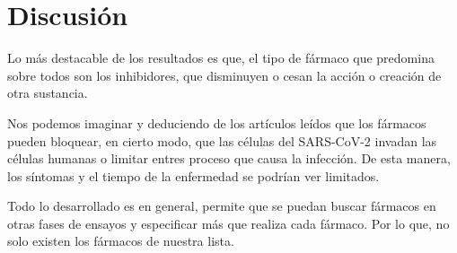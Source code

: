 \section{Discusión}
Lo más destacable de los resultados es que, el tipo de fármaco que predomina sobre todos son los inhibidores, que disminuyen o cesan la acción o creación de otra sustancia. 

Nos podemos imaginar y deduciendo de los artículos leídos \cite{Gordon2020} \cite{Gysi2020} \cite{Sayed2020} que los fármacos pueden bloquear, en cierto modo, que las células del SARS-CoV-2 invadan las células humanas o limitar entres proceso que causa la infección. De esta manera, los síntomas y el tiempo de la enfermedad se podrían ver limitados. 

Todo lo desarrollado es en general, permite que se puedan buscar fármacos en otras fases de ensayos y especificar más que realiza cada fármaco. Por lo que, no solo existen los fármacos de nuestra lista. 